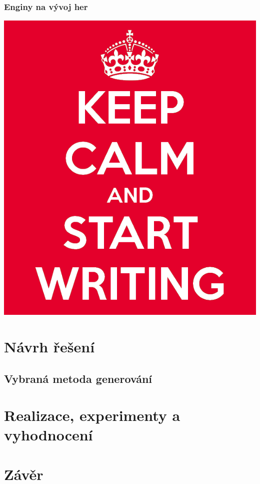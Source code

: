 \subsection{Enginy na vývoj her}
\label{enginy}
\includegraphics[scale=0.3]{obrazky-figures/keep-calm.png}

\textcolor{gray}{\blindtext[18]}

\chapter{Návrh řešení}
\label{solution}
\textcolor{gray}{\blindtext[2]}
\textcolor{gray}{\blindtext[46]}

\section{Vybraná metoda generování}
\textcolor{gray}{\blindtext[46]}

\chapter{Realizace, experimenty a vyhodnocení}
\label{realization}
\textcolor{gray}{\blindtext[94]}

\chapter{Závěr}
\label{end}
\textcolor{gray}{\blindtext[4]}